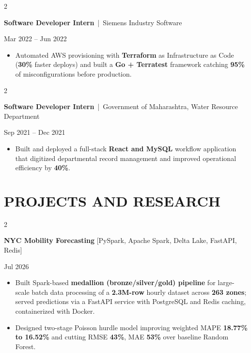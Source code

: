 \documentclass[10pt, letterpaper]{article}
\newenvironment{highlights}{
    \begin{itemize}[
        topsep=0.10 cm,
        parsep=0.06 cm,
        partopsep=0pt,
        itemsep=0.06 cm,
        leftmargin=12pt
    ]
}{
    \end{itemize}
}
\newenvironment{twocolentry}[2][]{
    \onecolentry
    \def\secondColumn{#2}
    \setcolumnwidth{\fill, 4.5 cm}
    \begin{paracol}{2}
}{
    \switchcolumn \raggedleft \secondColumn
    \end{paracol}
    \endonecolentry
}
\begin{document}
\vspace{0.15 cm}

\begin{twocolentry}{Mar 2022 -- Jun 2022}
\textbf{Software Developer Intern} \,|\, Siemens Industry Software
\end{twocolentry}
\begin{highlights}
  \item Automated AWS provisioning with \textbf{Terraform} as Infrastructure as Code (\textbf{30\%} faster deploys) and built a \textbf{Go + Terratest} framework catching \textbf{95\%} of misconfigurations before production.
\end{highlights}

\vspace{0.15 cm}

\begin{twocolentry}{Sep 2021 -- Dec 2021}
\textbf{Software Developer Intern} \,|\, Government of Maharashtra, Water Resource Department
\end{twocolentry}
\begin{highlights}
  \item Built and deployed a full-stack \textbf{React and MySQL} workflow application that digitized departmental record management and improved operational efficiency by \textbf{40\%}.
\end{highlights}

\section{PROJECTS AND RESEARCH}
\begin{twocolentry}{Jul 2026}
\textbf{NYC Mobility Forecasting} [PySpark, Apache Spark, Delta Lake, FastAPI, Redis]
\end{twocolentry}
\begin{highlights}
  \item Built Spark-based \textbf{medallion (bronze/silver/gold) pipeline} for large-scale batch data processing of a \textbf{2.3M-row} hourly dataset across \textbf{263 zones}; served predictions via a FastAPI service with PostgreSQL and Redis caching, containerized with Docker.
  \item Designed two-stage Poisson hurdle model improving weighted MAPE \textbf{18.77\% to 16.52\%} and cutting RMSE \textbf{43\%}, MAE \textbf{53\%} over baseline Random Forest.
\end{highlights}
\end{document}

